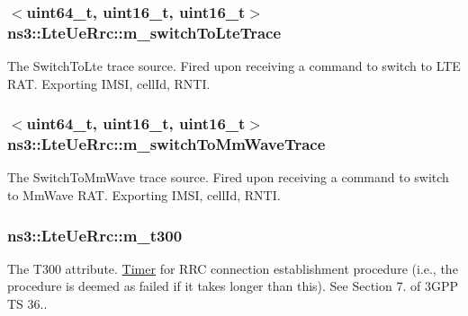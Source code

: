 \subsubsection[{\texorpdfstring{m\+\_\+switch\+To\+Lte\+Trace}{m_switchToLteTrace}}]{$<$uint64\+\_\+t, uint16\+\_\+t, uint16\+\_\+t$>$ ns3\+::\+Lte\+Ue\+Rrc\+::m\+\_\+switch\+To\+Lte\+Trace\hspace{0.3cm}{\ttfamily [private]}}\hypertarget{classns3_1_1LteUeRrc_ac2e5a6cefe599874f1f54c19fbd20a35}{}\label{classns3_1_1LteUeRrc_ac2e5a6cefe599874f1f54c19fbd20a35}
The {\ttfamily Switch\+To\+Lte} trace source. Fired upon receiving a command to switch to L\+TE R\+AT. Exporting I\+M\+SI, cell\+Id, R\+N\+TI. 
\subsubsection[{\texorpdfstring{m\+\_\+switch\+To\+Mm\+Wave\+Trace}{m_switchToMmWaveTrace}}]{$<$uint64\+\_\+t, uint16\+\_\+t, uint16\+\_\+t$>$ ns3\+::\+Lte\+Ue\+Rrc\+::m\+\_\+switch\+To\+Mm\+Wave\+Trace\hspace{0.3cm}{\ttfamily [private]}}\hypertarget{classns3_1_1LteUeRrc_a7639b7deb1468b3ba98c4c8731832597}{}\label{classns3_1_1LteUeRrc_a7639b7deb1468b3ba98c4c8731832597}
The {\ttfamily Switch\+To\+Mm\+Wave} trace source. Fired upon receiving a command to switch to Mm\+Wave R\+AT. Exporting I\+M\+SI, cell\+Id, R\+N\+TI. 
\subsubsection[{\texorpdfstring{m\+\_\+t300}{m_t300}}]{ ns3\+::\+Lte\+Ue\+Rrc\+::m\+\_\+t300\hspace{0.3cm}{\ttfamily [private]}}\hypertarget{classns3_1_1LteUeRrc_ab69b12ce9b9d4088e626dbca0a21bc0a}{}\label{classns3_1_1LteUeRrc_ab69b12ce9b9d4088e626dbca0a21bc0a}
The {\ttfamily T300} attribute. \hyperlink{classns3_1_1Timer}{Timer} for R\+RC connection establishment procedure (i.\+e., the procedure is deemed as failed if it takes longer than this). See Section 7. of 3\+G\+PP TS 36.. 
